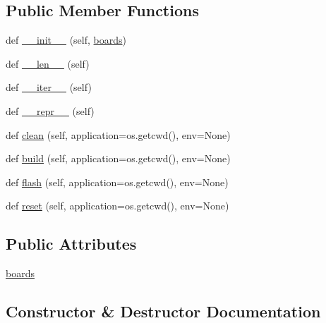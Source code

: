 \subsection*{Public Member Functions}
\begin{DoxyCompactItemize}
\item 
def \hyperlink{class01-run_1_1BoardGroup_adc47d7a92fc3c50e624676df5636d0a8}{\+\_\+\+\_\+init\+\_\+\+\_\+} (self, \hyperlink{class01-run_1_1BoardGroup_a4787c8cf92a9886de709f4672871e97d}{boards})
\item 
def \hyperlink{class01-run_1_1BoardGroup_a6e57659757b92e6a5ba079e107d46cda}{\+\_\+\+\_\+len\+\_\+\+\_\+} (self)
\item 
def \hyperlink{class01-run_1_1BoardGroup_a292806df6a3d0bbc449d9300fb9fb10d}{\+\_\+\+\_\+iter\+\_\+\+\_\+} (self)
\item 
def \hyperlink{class01-run_1_1BoardGroup_a563dca3716cdc9e914fb7b1ef7933395}{\+\_\+\+\_\+repr\+\_\+\+\_\+} (self)
\item 
def \hyperlink{class01-run_1_1BoardGroup_a0ff28b67d88dac7ef0f8017396599293}{clean} (self, application=os.\+getcwd(), env=None)
\item 
def \hyperlink{class01-run_1_1BoardGroup_a5b1a23919cc4017b849142bcd705a2f2}{build} (self, application=os.\+getcwd(), env=None)
\item 
def \hyperlink{class01-run_1_1BoardGroup_a5211ec05b65869e7007d8b5c003f4b7b}{flash} (self, application=os.\+getcwd(), env=None)
\item 
def \hyperlink{class01-run_1_1BoardGroup_a9f63a54bde35775e751102a2852ac9c3}{reset} (self, application=os.\+getcwd(), env=None)
\end{DoxyCompactItemize}
\subsection*{Public Attributes}
\begin{DoxyCompactItemize}
\item 
\hyperlink{class01-run_1_1BoardGroup_a4787c8cf92a9886de709f4672871e97d}{boards}
\end{DoxyCompactItemize}


\subsection{Constructor \& Destructor Documentation}
\mbox{\label{class01-run_1_1BoardGroup_adc47d7a92fc3c50e624676df5636d0a8}} 
